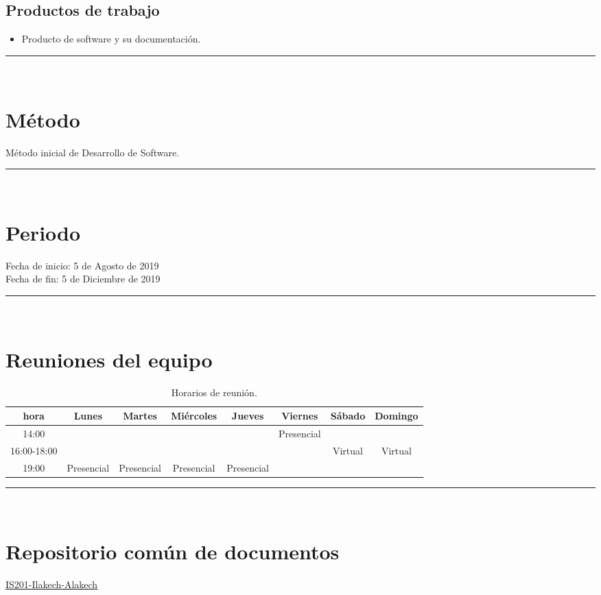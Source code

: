 \documentclass{article}
\begin{document}
\subsection*{Productos de trabajo}
\begin{itemize}
\item Producto de software y su documentación.
\end{itemize}

\rule{0.8\textwidth}{.8pt}\\

\section*{Método} Método inicial de Desarrollo de Software.


\rule{0.8\textwidth}{.8pt}\\

\section*{Periodo}
Fecha de inicio: 5 de Agosto de 2019\\
\indent Fecha de fin: 5 de Diciembre de 2019\\

\rule{0.8\textwidth}{.8pt}\\

\section*{Reuniones del equipo}

\begin{center}
  \begin{table}[H]
  \centering
  \begin{tabular}{| c | c | c | c | c | c | c | c | }
    \hline
    hora & Lunes & Martes & Miércoles & Jueves & Viernes & Sábado & Domingo \\
    \hline
    14:00 & & & & & Presencial & & \\ \hline
    16:00-18:00 & & & & &  & Virtual & Virtual\\ \hline    
    19:00 & Presencial & Presencial & Presencial & Presencial &  &  &  \\ \hline
  \end{tabular}
  \caption{Horarios de reunión.}
  \label{tabla:horarios}
  \end{table}
\end{center}

\rule{0.8\textwidth}{.8pt}\\

\section*{Repositorio común de documentos}
\href{https://drive.google.com/drive/folders/18_KMcs7qbq7PF_Ij9WvfzrCTSS1qXZC6}{IS201-Ilakech-Alakech}
\end{document}
